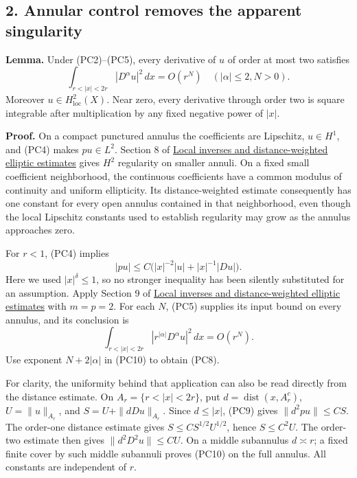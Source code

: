 \documentclass[
  11pt,
]{article}
\begin{document}
\subsection{2. Annular control removes the apparent
singularity}\label{annular-control-removes-the-apparent-singularity}

\textbf{Lemma.} Under (PC2)--(PC5), every derivative of \(u\) of order
at most two satisfies \[
\int_{r<|x|<2r}|D^\alpha u|^2\,dx=O(r^N)
\quad(|\alpha|\leq2, N>0).
\tag{PC8}
\] Moreover \(u\in H^2_{\mathrm{loc}}(X)\). Near zero, every derivative
through order two is square integrable after multiplication by any fixed
negative power of \(|x|\).

\textbf{Proof.} On a compact punctured annulus the coefficients are
Lipschitz, \(u\in H^1\), and (PC4) makes \(pu\in L^2\). Section 8 of
\href{local-elliptic-coefficients.pdf}{Local inverses and
distance-weighted elliptic estimates} gives \(H^2\) regularity on
smaller annuli. On a fixed small coefficient neighborhood, the
continuous coefficients have a common modulus of continuity and uniform
ellipticity. Its distance-weighted estimate consequently has one
constant for every open annulus contained in that neighborhood, even
though the local Lipschitz constants used to establish regularity may
grow as the annulus approaches zero.

For \(r<1\), (PC4) implies \[
|pu|\leq C\bigl(|x|^{-2}|u|+|x|^{-1}|Du|\bigr).
\tag{PC9}
\] Here we used \(|x|^\delta\leq1\), so no stronger inequality has been
silently substituted for an assumption. Apply Section 9 of
\href{local-elliptic-coefficients.pdf}{Local inverses and
distance-weighted elliptic estimates} with \(m=p=2\). For each \(N\),
(PC5) supplies its input bound on every annulus, and its conclusion is
\[
\int_{r<|x|<2r}|r^{|\alpha|}D^\alpha u|^2\,dx=O(r^N).
\tag{PC10}
\] Use exponent \(N+2|\alpha|\) in (PC10) to obtain (PC8).

For clarity, the uniformity behind that application can also be read
directly from the distance estimate. On \(A_r=\{r<|x|<2r\}\), put
\(d=\operatorname{dist}(x,A_r^c)\), \(U=\|u\|_{A_r}\), and
\(S=U+\|dDu\|_{A_r}\). Since \(d\leq|x|\), (PC9) gives
\(\|d^2pu\|\leq CS\). The order-one distance estimate gives
\(S\leq C S^{1/2}U^{1/2}\), hence \(S\leq C^2U\). The order-two estimate
then gives \(\|d^2D^2u\|\leq CU\). On a middle subannulus \(d\asymp r\);
a fixed finite cover by such middle subannuli proves (PC10) on the full
annulus. All constants are independent of \(r\).
\end{document}
